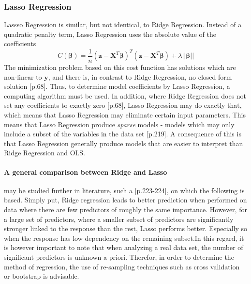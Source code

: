 \documentclass[%
oneside,                 %
final,                   %
10pt]{article}
\begin{document}
\subsubsection{Lasso Regression}
Lassso Regression is similar, but not identical, to Ridge Regression. Instead of a quadratic penalty term, Lasso Regression uses the absolute value of the coefficients \citep{MHJ_LinReg}
\begin{equation}
C(\bm{\beta})=\frac{1}{n}(\bm{z}-\bm{X}^T\bm{\beta})^T(\bm{z}-\bm{X}^T\bm{\beta})+\lambda ||\bm{\beta}||
\label{eq:LassoCost}
\end{equation}
The minimization problem based on this cost function has solutions which are non-linear to $\bm{y}$, and there is, in contrast to Ridge Regression, no closed form solution \citep{HastieTrevor2009TEoS}[p.68]. Thus, to determine model coefficients by Lasso Regression, a computing algorithm must be used. In addition, where Ridge Regression does not set any coefficients to exactly zero \citep{HastieTrevor2009TEoS}[p.68], Lasso Regression may do exactly that, which means that Lasso Regression may eliminate certain input parameters. This means that Lasso Regression produce \textit{sparse} models - models which may only include a subset of the variables in the data set \citep{2017introstatlearn}[p.219]. A consequence of this is that Lasso Regression generally produce models that are easier to interpret than Ridge Regression and OLS. 

\paragraph{A general comparison between Ridge and Lasso} may be studied further in literature, such a \citep{2017introstatlearn}[p.223-224], on which the following is based. Simply put, Ridge regression leads to better prediction when performed on data where there are few predictors of roughly the same importance. However, for a large set of predictors, where a smaller subset of predictors are significantly stronger linked to the response than the rest, Lasso performs better. Especially so when the response has low dependency on the remaining subset.In this regard, it is however important to note that when analyzing a real data set, the number of significant predictors is unknown a priori. Therefor, in order to determine the method of regression, the use of re-sampling techniques such as cross validation or bootstrap is advisable.

 
\end{document}
